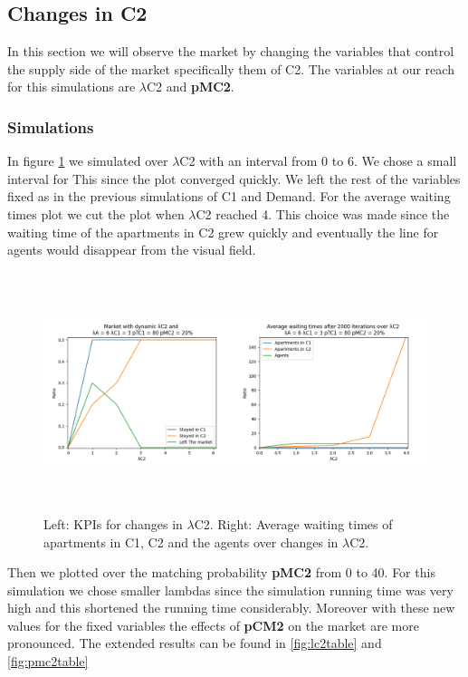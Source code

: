 \subsection{Changes in C2}

In this section we will observe the market by changing the variables that control the supply side of the market specifically them of C2. The variables at our reach for this simulations are $\lambda$C2 and \textbf{pMC2}. 

\subsubsection{Simulations}

In figure \ref{fig:lambdac2} we simulated over $\lambda$C2 with an interval from 0 to 6. We chose a small interval for This since the plot converged quickly. We left the rest of the variables fixed as in the previous simulations of C1 and Demand. For the average waiting times plot we cut the plot when $\lambda$C2 reached 4. This choice was made since the waiting time of the apartments in C2 grew quickly and eventually the line for agents would disappear from the visual field.

\begin{figure}
    \centering
    \includegraphics[width=1\linewidth, height = 7cm]{figures/lambdaC2.png}
    \caption{Left: KPIs for changes in $\lambda$C2. Right: Average waiting times of apartments in C1, C2 and the agents over changes in $\lambda$C2.}
    \label{fig:lambdac2}
\end{figure}

Then we plotted over the matching probability \textbf{pMC2} from 0 to 40. For this simulation we chose smaller lambdas since the simulation running time was very high and this shortened the running time considerably. Moreover with these new values for the fixed variables the effects of \textbf{pCM2} on the market are more pronounced. The extended results can be found in \ref{fig:lc2table} and \ref{fig:pmc2table}

